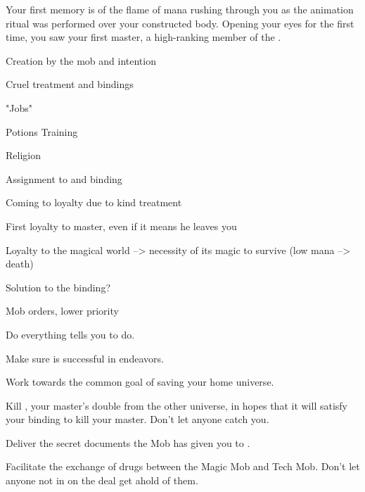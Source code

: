 \documentclass[char]{guildcamp3}
\begin{document}
\name{\cServant{}}


Your first memory is of the flame of mana rushing through you as the animation ritual was performed over your constructed body. Opening your eyes for the first time, you saw your first master, a high-ranking member of the \bMagicMob{}.

Creation by the mob and intention

Cruel treatment and bindings

"Jobs"

Potions Training

Religion

Assignment to \NobleOne{} and binding

Coming to loyalty due to kind treatment

First loyalty to master, even if it means he leaves you

Loyalty to the magical world --> necessity of its magic to survive
(low mana --> death)

Solution to the binding?

Mob orders, lower priority

\begin{itemz}[Goals]
  \item Do everything \cNobleOne{} tells you to do.
  \item Make sure \cNobleOne{} is successful in \cNobleOne{\their} endeavors.
  \item Work towards the common goal of saving your home universe.
  \item Kill \PoliOne{}, your master's double from the other universe, in hopes that it will satisfy your binding to kill your master. Don't let anyone catch you.
  \item Deliver the secret documents the Mob has given you to \SpecOpTwo{}.
  \item Facilitate the exchange of drugs between the Magic Mob and Tech Mob. Don't let anyone not in on the deal get ahold of them.
\end{itemz}
\end{document}
